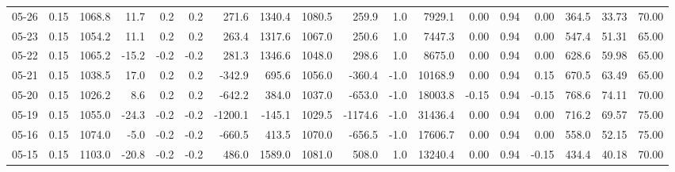 \begin{threeparttable}
{\begin{tabular}{lrrrrrrrrrrrrrrrrr}
  05-26 &     0.15 & 1068.8 &              11.7 &               0.2 &                0.2 &              271.6 & 1340.4 & 1080.5 &      259.9 &                      1.0 &              7929.1 &       0.00 &      0.94 &           0.00 &            364.5 &           33.73 &                  70.00 \\
  05-23 &     0.15 & 1054.2 &              11.1 &               0.2 &                0.2 &              263.4 & 1317.6 & 1067.0 &      250.6 &                      1.0 &              7447.3 &       0.00 &      0.94 &           0.00 &            547.4 &           51.31 &                  65.00 \\
  05-22 &     0.15 & 1065.2 &             -15.2 &              -0.2 &               -0.2 &              281.3 & 1346.6 & 1048.0 &      298.6 &                      1.0 &              8675.0 &       0.00 &      0.94 &           0.00 &            628.6 &           59.98 &                  65.00 \\
  05-21 &     0.15 & 1038.5 &              17.0 &               0.2 &                0.2 &             -342.9 &  695.6 & 1056.0 &     -360.4 &                     -1.0 &             10168.9 &       0.00 &      0.94 &           0.15 &            670.5 &           63.49 &                  65.00 \\
  05-20 &     0.15 & 1026.2 &               8.6 &               0.2 &                0.2 &             -642.2 &  384.0 & 1037.0 &     -653.0 &                     -1.0 &             18003.8 &      -0.15 &      0.94 &          -0.15 &            768.6 &           74.11 &                  70.00 \\
  05-19 &     0.15 & 1055.0 &             -24.3 &              -0.2 &               -0.2 &            -1200.1 & -145.1 & 1029.5 &    -1174.6 &                     -1.0 &             31436.4 &       0.00 &      0.94 &           0.00 &            716.2 &           69.57 &                  75.00 \\
  05-16 &     0.15 & 1074.0 &              -5.0 &              -0.2 &               -0.2 &             -660.5 &  413.5 & 1070.0 &     -656.5 &                     -1.0 &             17606.7 &       0.00 &      0.94 &           0.00 &            558.0 &           52.15 &                  75.00 \\
  05-15 &     0.15 & 1103.0 &             -20.8 &              -0.2 &               -0.2 &              486.0 & 1589.0 & 1081.0 &      508.0 &                      1.0 &             13240.4 &       0.00 &      0.94 &          -0.15 &            434.4 &           40.18 &                  70.00 \\

\end{tabular}}
\end{threeparttable}
